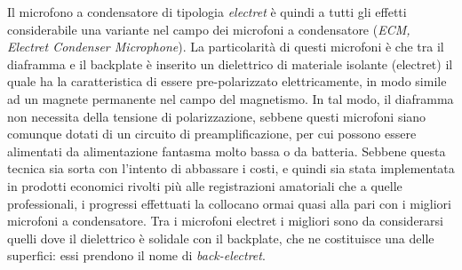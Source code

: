 \begin{refsection}
Il microfono a condensatore di tipologia \emph{electret} è quindi a tutti gli effetti
considerabile una variante nel campo dei microfoni a condensatore (\emph{ECM,
Electret Condenser Microphone}). La particolarità di questi microfoni è che tra
il diaframma e il backplate è inserito un dielettrico di materiale isolante
(electret) il quale ha la caratteristica di essere pre-polarizzato
elettricamente, in modo simile ad un magnete permanente nel campo del magnetismo.
In tal modo, il diaframma non necessita della tensione di polarizzazione,
sebbene questi microfoni siano comunque dotati di un circuito di preamplificazione,
per cui possono essere alimentati da alimentazione fantasma molto bassa o da batteria.
Sebbene questa tecnica sia sorta con l’intento di abbassare i costi, e
quindi sia stata implementata in prodotti economici rivolti più alle registrazioni
amatoriali che a quelle professionali, i progressi effettuati la collocano ormai
quasi alla pari con i migliori microfoni a condensatore. Tra i microfoni electret
i migliori sono da considerarsi quelli dove il dielettrico è solidale con il
backplate, che ne costituisce una delle superfici: essi prendono il nome di
\emph{back-electret}.



\end{refsection}
